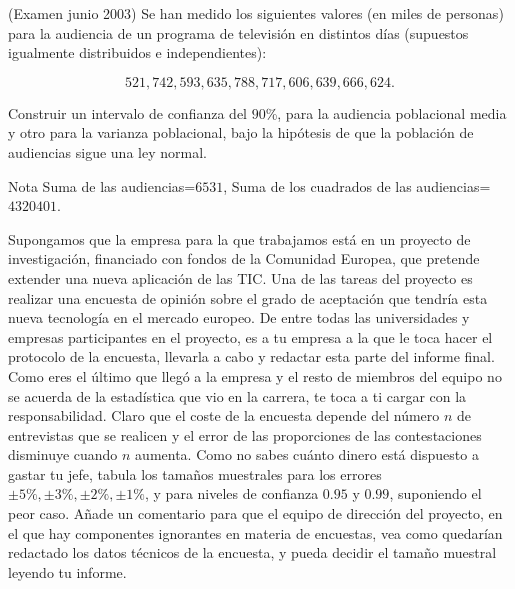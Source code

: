 \documentclass[12pt]{article}
\begin{document}
\begin{prob}(Examen junio 2003) Se han medido los siguientes valores (en miles de personas) para la audiencia de un
programa de televisión en distintos días (supuestos igualmente distribuidos e
independientes):

$$521, 742, 593, 635, 788, 717, 606, 639, 666, 624.$$

Construir un intervalo de confianza del $90$\%, para la audiencia poblacional media y otro
para la varianza poblacional, bajo la hipótesis de que la población de audiencias sigue una
ley normal.

Nota Suma de las audiencias=$6531$, Suma de los cuadrados de las audiencias=$4320401$.
\end{prob}

\begin{prob}
Supongamos que la empresa para la que trabajamos está en un proyecto de investigación,
financiado con fondos de la Comunidad Europea, que pretende extender una nueva aplicación
de las TIC. Una de las tareas del proyecto es realizar una encuesta de opinión sobre el
grado de aceptación que tendría esta nueva tecnología en el mercado europeo. De entre todas
las universidades y empresas participantes en el proyecto, es a tu empresa a la que le toca
hacer el protocolo de la encuesta, llevarla a cabo y redactar esta parte del informe final.
Como eres el último que llegó a la empresa y el resto de miembros del equipo no se acuerda
de la estadística que vio en la carrera, te toca a ti cargar con la responsabilidad. Claro
que el coste de la encuesta depende del número $n$ de entrevistas que se realicen y el
error de las proporciones de las contestaciones disminuye cuando $n$ aumenta. Como no sabes
cuánto dinero está dispuesto a gastar tu jefe, tabula los tamaños muestrales para los
errores $\pm 5\%, \pm 3\%, \pm 2\%,\pm 1\%$, y para niveles de confianza $0.95$ y $0.99$,
suponiendo el peor caso. Añade un comentario para que el equipo de dirección del proyecto,
en el que hay componentes ignorantes en  materia de encuestas, vea como quedarían redactado
los datos técnicos de la encuesta, y pueda decidir  el tamaño muestral leyendo tu informe.
\end{prob}
\end{document}
